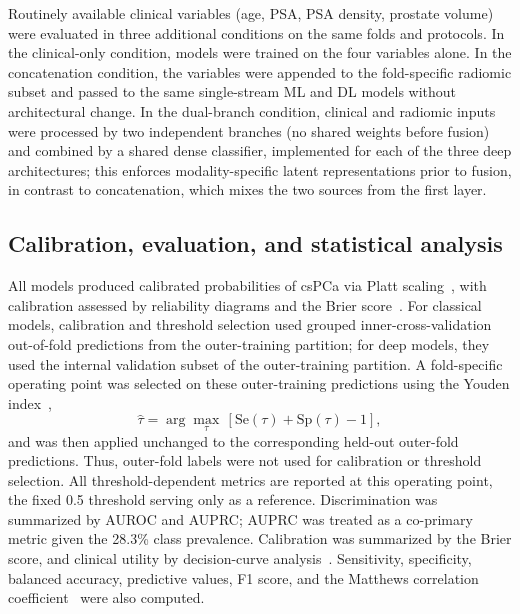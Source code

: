 \documentclass[11pt]{article}
\begin{document}
Routinely available clinical variables (age, PSA, PSA density, prostate volume)
were evaluated in three additional conditions on the same folds and protocols.
In the clinical-only condition, models were trained on the four variables alone.
In the concatenation condition, the variables were appended to the fold-specific
radiomic subset and passed to the same single-stream ML and DL models without
architectural change. In the dual-branch condition, clinical and radiomic
inputs were processed by two independent branches (no shared weights before
fusion) and combined by a shared dense classifier, implemented for each of the
three deep architectures; this enforces modality-specific latent representations
prior to fusion, in contrast to concatenation, which mixes the two sources from
the first layer.

\subsection{Calibration, evaluation, and statistical analysis}
\label{sec:eval}

All models produced calibrated probabilities of csPCa via Platt
scaling~\citep{platt1999probabilistic}, with calibration assessed by reliability
diagrams and the Brier score~\citep{brier1950verification}. For classical
models, calibration and threshold selection used grouped inner-cross-validation
out-of-fold predictions from the outer-training partition; for deep models,
they used the internal validation subset of the outer-training partition. A
fold-specific operating point was selected on these outer-training predictions
using the Youden index~\citep{youden1950index},
\begin{equation}
  \hat{\tau} = \arg\max_{\tau}\,[\mathrm{Se}(\tau) + \mathrm{Sp}(\tau) - 1],
  \label{eq:youden}
\end{equation}
and was then applied unchanged to the corresponding held-out outer-fold
predictions. Thus, outer-fold labels were not used for calibration or threshold
selection. All threshold-dependent metrics are reported at this operating
point, the fixed 0.5 threshold serving only as a reference. Discrimination was
summarized by AUROC and AUPRC; AUPRC was treated as a co-primary metric given
the 28.3\% class prevalence. Calibration was summarized by the Brier score, and
clinical utility by decision-curve analysis~\citep{vickers2006decision}.
Sensitivity, specificity, balanced accuracy, predictive values, F1 score, and
the Matthews correlation coefficient~\citep{matthews1975comparison} were also
computed.
\end{document}
